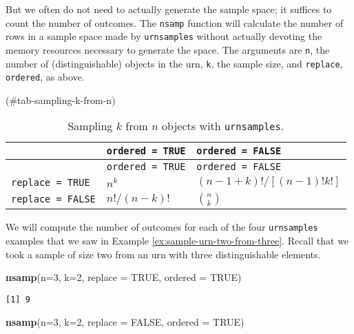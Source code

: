 \documentclass[]{book}
\newenvironment{Shaded}{\begin{snugshade}}{\end{snugshade}}
\newcommand{\KeywordTok}[1]{\textcolor[rgb]{0.13,0.29,0.53}{\textbf{{#1}}}}
\newcommand{\DataTypeTok}[1]{\textcolor[rgb]{0.13,0.29,0.53}{{#1}}}
\newcommand{\DecValTok}[1]{\textcolor[rgb]{0.00,0.00,0.81}{{#1}}}
\newcommand{\OtherTok}[1]{\textcolor[rgb]{0.56,0.35,0.01}{{#1}}}
\newcommand{\NormalTok}[1]{{#1}}
\numberwithin{equation}{chapter}
\numberwithin{figure}{chapter}
\theoremstyle{plain}
\theoremstyle{definition}
\theoremstyle{remark}
\theoremstyle{definition}
\theoremstyle{definition}
\theoremstyle{remark}
\let\BeginKnitrBlock\begin \let\EndKnitrBlock\end
\begin{document}
But we often do not need to actually generate the sample space; it
suffices to count the number of outcomes. The \texttt{nsamp} function
will calculate the number of rows in a sample space made by
\texttt{urnsamples} without actually devoting the memory resources
necessary to generate the space. The arguments are \texttt{n}, the
number of (distinguishable) objects in the urn, \texttt{k}, the sample
size, and \texttt{replace}, \texttt{ordered}, as above.

(\#tab-sampling-k-from-n)

\begin{longtable}[]{@{}lll@{}}
\caption{Sampling \(k\) from \(n\) objects with
\texttt{urnsamples}.}\tabularnewline
\toprule
& \texttt{ordered\ =\ TRUE} & \texttt{ordered\ =\ FALSE}\tabularnewline
\midrule
\endfirsthead
\toprule
& \texttt{ordered\ =\ TRUE} & \texttt{ordered\ =\ FALSE}\tabularnewline
\midrule
\endhead
\texttt{replace\ =\ TRUE} & \(n^{k}\) &
\((n-1+k)! / [(n-1)!k!]\)\tabularnewline
\texttt{replace\ =\ FALSE} & \(n! / (n-k)!\) &
\({n \choose k}\)\tabularnewline
\bottomrule
\end{longtable}

\bigskip

\BeginKnitrBlock{example}
\protect\hypertarget{ex:unnamed-chunk-140}{}{\label{ex:unnamed-chunk-140}}We
will compute the number of outcomes for each of the four
\texttt{urnsamples} examples that we saw in Example
\ref{ex:sample-urn-two-from-three}. Recall that we took a sample of size
two from an urn with three distinguishable elements.
\EndKnitrBlock{example}

\begin{Shaded}
\begin{Highlighting}[]
\KeywordTok{nsamp}\NormalTok{(}\DataTypeTok{n=}\DecValTok{3}\NormalTok{, }\DataTypeTok{k=}\DecValTok{2}\NormalTok{, }\DataTypeTok{replace =} \OtherTok{TRUE}\NormalTok{, }\DataTypeTok{ordered =} \OtherTok{TRUE}\NormalTok{) }
\end{Highlighting}
\end{Shaded}

\begin{verbatim}
[1] 9
\end{verbatim}

\begin{Shaded}
\begin{Highlighting}[]
\KeywordTok{nsamp}\NormalTok{(}\DataTypeTok{n=}\DecValTok{3}\NormalTok{, }\DataTypeTok{k=}\DecValTok{2}\NormalTok{, }\DataTypeTok{replace =} \OtherTok{FALSE}\NormalTok{, }\DataTypeTok{ordered =} \OtherTok{TRUE}\NormalTok{) }
\end{Highlighting}
\end{Shaded}
\end{document}
